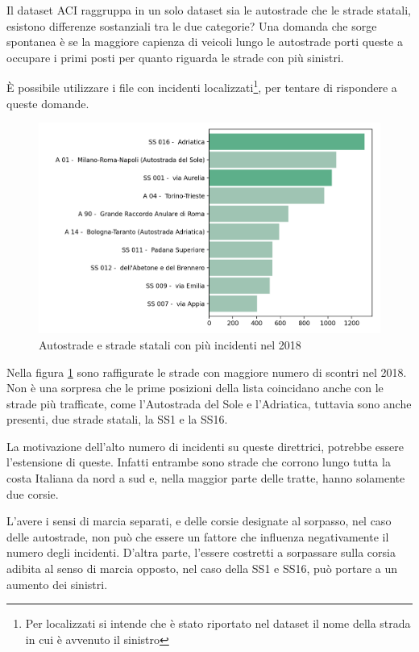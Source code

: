 \documentclass[a4paper,12pt]{report}
\begin{document}
Il dataset ACI raggruppa in un solo dataset sia le autostrade che le strade statali, 
esistono differenze sostanziali tra le due categorie? 
Una domanda che sorge spontanea è se
la maggiore capienza di veicoli lungo le autostrade porti queste a occupare i primi 
posti per quanto riguarda le strade con più sinistri. 

\`E possibile utilizzare i file con incidenti 
localizzati\footnote{Per localizzati si intende che è stato riportato nel dataset 
il nome della strada in cui è avvenuto il sinistro}, 
per tentare di rispondere a queste domande. 

\begin{figure}
    \includegraphics[width=\linewidth]{../src/incidenti/incidenti_aci/autostrade/autostrade.png}
    \caption{Autostrade e strade statali con più incidenti nel 2018}
    \label{fig:incidenti-autostrade}
\end{figure}

Nella figura \ref{fig:incidenti-autostrade} sono  raffigurate le strade con 
maggiore numero di scontri nel 2018. 
Non è una sorpresa che le prime posizioni della lista coincidano 
anche con le strade più trafficate, come l'Autostrada del Sole e l'Adriatica, 
tuttavia sono anche presenti, due strade statali, la SS1 e la SS16. 

La motivazione dell'alto numero di incidenti su queste direttrici, potrebbe essere 
l'estensione di queste. Infatti entrambe sono strade che corrono lungo tutta la 
costa Italiana da nord a sud e, nella maggior parte delle tratte, 
hanno solamente due corsie. 

L'avere i sensi di marcia separati, e delle corsie designate al sorpasso, nel caso 
delle autostrade, non può che essere un fattore che influenza negativamente 
il numero degli incidenti. 
D'altra parte, l'essere costretti a sorpassare sulla corsia adibita al senso di 
marcia opposto, nel caso della SS1 e SS16, può portare a un aumento dei 
sinistri. 
\end{document}
